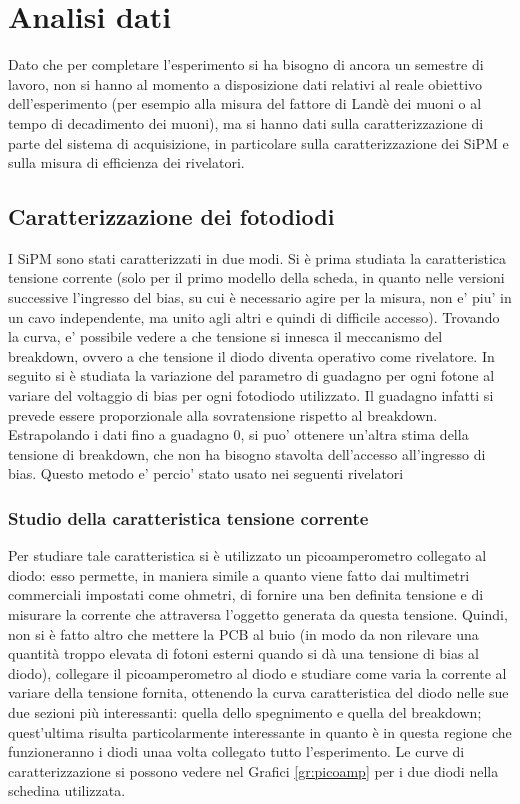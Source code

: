 \section{Analisi dati}
Dato che per completare l'esperimento si ha bisogno di ancora un semestre di lavoro, non si hanno al momento a disposizione dati relativi al reale obiettivo dell'esperimento
(per esempio alla misura del fattore di Landè dei muoni o al tempo di decadimento dei muoni), ma si hanno dati sulla caratterizzazione di parte del sistema di acquisizione,
in particolare sulla caratterizzazione dei SiPM e sulla misura di efficienza dei rivelatori.

\subsection{Caratterizzazione dei fotodiodi}
I SiPM sono stati caratterizzati in due modi. Si è prima studiata la caratteristica tensione corrente (solo per il primo modello della scheda, in quanto nelle versioni successive l'ingresso del bias, su cui \`e necessario agire per la misura, non e' piu' in un cavo independente, ma unito agli altri e quindi di difficile accesso). Trovando la curva, e' possibile vedere a che tensione si innesca il meccanismo del breakdown, ovvero a che tensione il diodo diventa operativo come rivelatore.
In seguito si è studiata la variazione del parametro di guadagno per ogni fotone al variare del voltaggio di bias per ogni fotodiodo utilizzato. Il guadagno infatti si prevede essere proporzionale alla sovratensione rispetto al breakdown. Estrapolando i dati fino a guadagno 0, si puo' ottenere un'altra stima della tensione di breakdown, che non ha bisogno stavolta dell'accesso all'ingresso di bias. Questo metodo e' percio' stato usato nei seguenti rivelatori

\subsubsection{Studio della caratteristica tensione corrente}
Per studiare tale caratteristica si è utilizzato un picoamperometro collegato al diodo: esso permette, in maniera simile a quanto viene fatto dai multimetri commerciali
impostati come ohmetri, di fornire una ben definita tensione e di misurare la corrente che attraversa l'oggetto generata da questa tensione. Quindi,
non si è fatto altro che mettere la PCB al buio (in modo da non rilevare una quantità troppo elevata di fotoni esterni quando si dà una tensione di bias al diodo),
collegare il picoamperometro al diodo e studiare come varia la corrente al variare della tensione fornita, ottenendo la curva caratteristica del diodo nelle sue due
sezioni più interessanti: quella dello spegnimento e quella del breakdown; quest'ultima risulta particolarmente interessante in quanto è in questa regione che funzioneranno
i diodi unaa volta collegato tutto l'esperimento. Le curve di caratterizzazione si possono vedere nel Grafici \ref{gr:picoamp} per i due  diodi nella schedina utilizzata.

